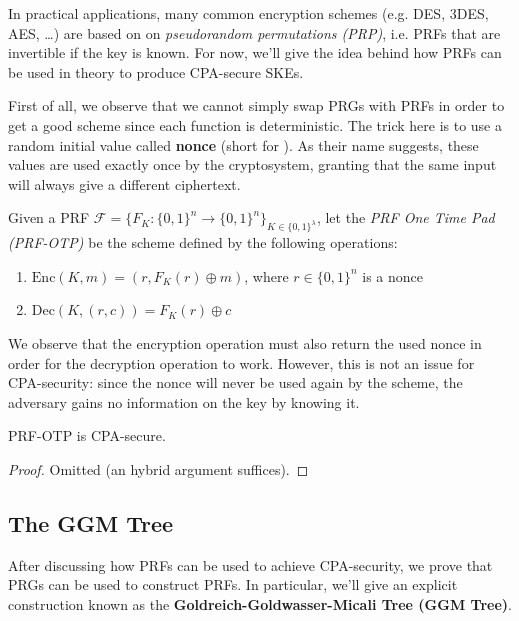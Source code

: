 \documentclass[a4paper, 12pt]{report}
\begin{document}
    In practical applications, many common encryption schemes (e.g. DES, 3DES, AES, \dots) are based on on \textit{pseudorandom permutations (PRP)}, i.e. PRFs that are invertible if the key is known. For now, we'll give the idea behind how PRFs can be used in theory to produce CPA-secure SKEs.
    
    First of all, we observe that we cannot simply swap PRGs with PRFs in order to get a good scheme since each function is deterministic. The trick here is to use a random initial value called \textbf{nonce} (short for ). As their name suggests, these values are used exactly once by the cryptosystem, granting that the same input will always give a different ciphertext.
    
    Given a PRF $\mathcal{F} = \{F_K : \{0,1\}^n \to \{0,1\}^n\}_{K \in \{0,1\}^\lambda}$, let the \textit{PRF One Time Pad (PRF-OTP)} be the scheme defined by the following operations:
    \begin{enumerate}
        \item $\mathrm{Enc}(K,m) = (r, F_K(r) \oplus m)$, where $r \in \{0,1\}^n$ is a nonce
        \item $\mathrm{Dec}(K,(r,c)) = F_K(r) \oplus c$
    \end{enumerate}
    
    We observe that the encryption operation must also return the used nonce in order for the decryption operation to work. However, this is not an issue for CPA-security: since the nonce will never be used again by the scheme, the adversary gains no information on the key by knowing it.

    \begin{framedprop}{}
        PRF-OTP is CPA-secure.
    \end{framedprop}

    \begin{proof}
        Omitted (an hybrid argument suffices).
    \end{proof}

    \subsection{The GGM Tree}
    
    After discussing how PRFs can be used to achieve CPA-security, we prove that PRGs can be used to construct PRFs. In particular, we'll give an explicit construction known as the \textbf{Goldreich-Goldwasser-Micali Tree (GGM Tree)}.
\end{document}
